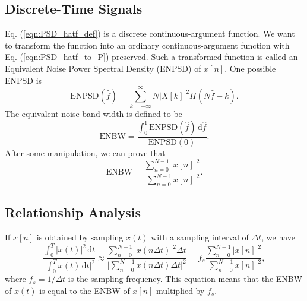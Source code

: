 \documentclass[journal,twoside]{IEEEtran}
\newcommand{\dd}{\,\mathrm{d}}
\begin{document}
\subsection{Discrete-Time Signals}

Eq. (\ref{eqn:PSD_hatf_def}) is a discrete continuous-argument function. We want to transform the function into an ordinary continuous-argument function with Eq. (\ref{eqn:PSD_hatf_to_P}) preserved. Such a transformed function is called an Equivalent Noise Power Spectral Density (ENPSD) of $x[n]$. One possible ENPSD is
\begin{equation}
\mathrm{ENPSD}(\hat{f}) = \sum_{k=-\infty}^{\infty} N |X[k]|^2 \Pi (N \hat{f} - k).
\end{equation}
The equivalent noise band width is defined to be
\begin{equation}
\mathrm{ENBW} = \frac{\int_{0}^{1}\mathrm{ENPSD}(\hat{f})\dd \hat{f}}{\mathrm{ENPSD}(0)}.
\end{equation}
After some manipulation, we can prove that
\begin{equation}
\mathrm{ENBW} = \frac{\sum_{n=0}^{N-1}|x[n]|^2}{\lvert \sum_{n=0}^{N-1}x[n] \rvert^2}.
\end{equation}

\subsection{Relationship Analysis}

If $x[n]$ is obtained by sampling $x(t)$ with a sampling interval of $\Delta t$, we have
\begin{equation}
\frac{\int_{0}^{T}|x(t)|^2\dd t}{\lvert \int_{0}^{T}x(t)\dd t \rvert^2} \approx \frac{\sum_{n=0}^{N-1}|x(n \Delta t)|^2 \Delta t}{\lvert \sum_{n=0}^{N-1}x(n\Delta t)\Delta t \rvert^2} = f_{s} \frac{\sum_{n=0}^{N-1}|x[n]|^2}{\lvert \sum_{n=0}^{N-1}x[n] \rvert^2},
\end{equation}
where $f_{s} = 1/\Delta t$ is the sampling frequency. This equation means that the ENBW of $x(t)$ is equal to the ENBW of $x[n]$ multiplied by $f_s$.
\end{document}
